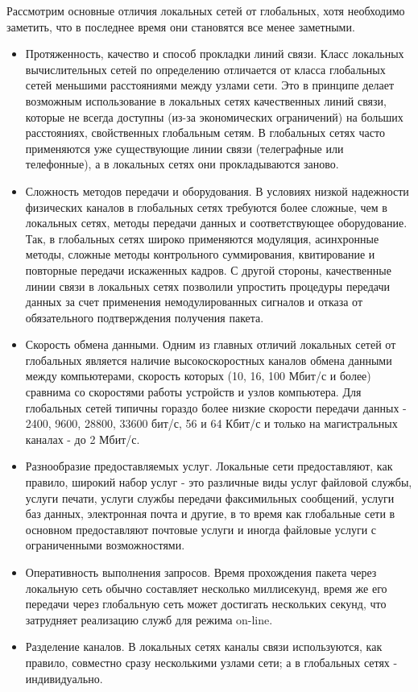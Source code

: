 Рассмотрим основные отличия локальных сетей от глобальных, хотя необходимо заметить, что в последнее время они становятся все менее заметными.
\begin{itemize}
    \item Протяженность, качество и способ прокладки линий связи.
        Класс локальных вычислительных сетей по определению отличается от класса глобальных сетей меньшими расстояниями между узлами сети.
        Это в принципе делает возможным использование в локальных сетях качественных линий связи, которые не всегда доступны (из-за экономических ограничений) на больших расстояниях, свойственных глобальным сетям.
        В глобальных сетях часто применяются уже существующие линии связи (телеграфные или телефонные), а в локальных сетях они прокладываются заново.
    \item Сложность методов передачи и оборудования.
        В условиях низкой надежности физических каналов в глобальных сетях требуются более сложные, чем в локальных сетях, методы передачи данных и соответствующее оборудование.
        Так, в глобальных сетях широко применяются модуляция, асинхронные методы, сложные методы контрольного суммирования, квитирование и повторные передачи искаженных кадров.
        С другой стороны, качественные линии связи в локальных сетях позволили упростить процедуры передачи данных за счет применения немодулированных сигналов и отказа от обязательного подтверждения получения пакета.
    \item Скорость обмена данными.
        Одним из главных отличий локальных сетей от глобальных является наличие высокоскоростных каналов обмена данными между компьютерами, скорость которых (10, 16, 100 Мбит/с и более) сравнима со скоростями работы устройств и узлов компьютера.
        Для глобальных сетей типичны гораздо более низкие скорости передачи данных - 2400, 9600, 28800, 33600 бит/с, 56 и 64 Кбит/с и только на магистральных каналах - до 2 Мбит/с.
    \item Разнообразие предоставляемых  услуг.
        Локальные сети предоставляют, как правило, широкий набор услуг - это различные виды услуг файловой службы, услуги печати, услуги службы передачи факсимильных сообщений, услуги баз данных, электронная почта и другие, в то время как глобальные сети в основном предоставляют почтовые услуги и иногда файловые услуги с ограниченными возможностями.
    \item Оперативность выполнения запросов.
        Время прохождения пакета через локальную сеть обычно составляет несколько миллисекунд, время же его передачи через глобальную сеть может достигать нескольких секунд, что затрудняет реализацию служб для режима on-line.
    \item Разделение каналов.
        В локальных сетях каналы связи используются, как правило, совместно сразу несколькими узлами сети; а в глобальных сетях - индивидуально.
\end{itemize}

